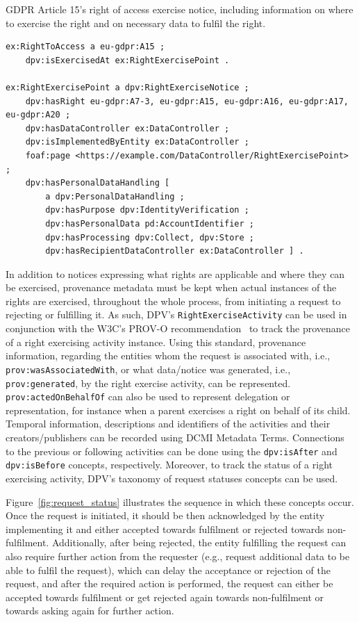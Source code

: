 \begin{listing}[htp]
\caption[GDPR Article 15's right of access exercise notice.]{GDPR Article 15's right of access exercise notice, including information on where to exercise the right and on necessary data to fulfil the right.}
\label{list:exercise_point}
\begin{verbatim}
ex:RightToAccess a eu-gdpr:A15 ;
    dpv:isExercisedAt ex:RightExercisePoint .

ex:RightExercisePoint a dpv:RightExerciseNotice ;
    dpv:hasRight eu-gdpr:A7-3, eu-gdpr:A15, eu-gdpr:A16, eu-gdpr:A17, eu-gdpr:A20 ;
    dpv:hasDataController ex:DataController ;
    dpv:isImplementedByEntity ex:DataController ;
    foaf:page <https://example.com/DataController/RightExercisePoint> ;
    dpv:hasPersonalDataHandling [ 
        a dpv:PersonalDataHandling ;
        dpv:hasPurpose dpv:IdentityVerification ;
        dpv:hasPersonalData pd:AccountIdentifier ;
        dpv:hasProcessing dpv:Collect, dpv:Store ;
        dpv:hasRecipientDataController ex:DataController ] .
\end{verbatim}
\end{listing}

In addition to notices expressing what rights are applicable and where they can be exercised, provenance metadata must be kept when actual instances of the rights are exercised, throughout the whole process, from initiating a request to rejecting or fulfilling it.
As such, DPV's \texttt{RightExerciseActivity} can be used in conjunction with the W3C's PROV-O recommendation~\citep{lebo_prov-o_2013} to track the provenance of a right exercising activity instance.
Using this standard, provenance information, regarding the entities whom the request is associated with, i.e., \texttt{prov:wasAssociatedWith}, or what data/notice was generated, i.e., \texttt{prov:generated}, by the right exercise activity, can be represented.
\texttt{prov:actedOnBehalfOf} can also be used to represent delegation or representation, for instance when a parent exercises a right on behalf of its child.
Temporal information, descriptions and identifiers of the activities and their creators/publishers can be recorded using DCMI Metadata Terms.
Connections to the previous or following activities can be done using the \texttt{dpv:isAfter} and \texttt{dpv:isBefore} concepts, respectively.
Moreover, to track the status of a right exercising activity, DPV's taxonomy of request statuses concepts can be used.

Figure~\ref{fig:request_status} illustrates the sequence in which these concepts occur.
Once the request is initiated, it should be then acknowledged by the entity implementing it and either accepted towards fulfilment or rejected towards non-fulfilment.
Additionally, after being rejected, the entity fulfilling the request can also require further action from the requester (e.g., request additional data to be able to fulfil the request), which can delay the acceptance or rejection of the request, and after the required action is performed, the request can either be accepted towards fulfilment or get rejected again towards non-fulfilment or towards asking again for further action.

